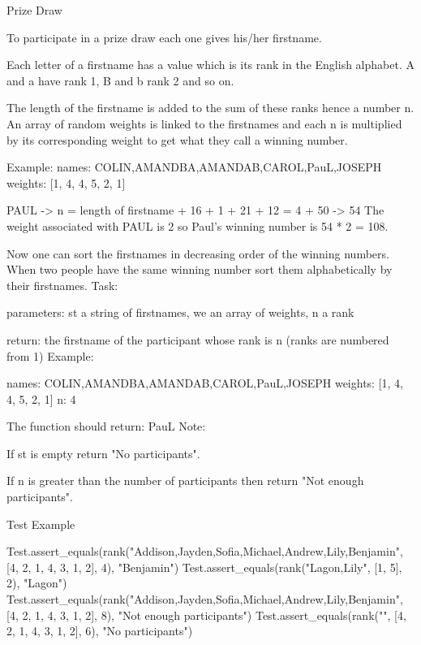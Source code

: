 Prize Draw

To participate in a prize draw each one gives his/her firstname.

Each letter of a firstname has a value which is its rank in the English alphabet. A and a have rank 1, B and b rank 2 and so on.

The length of the firstname is added to the sum of these ranks hence a number n. An array of random weights is linked to the firstnames and each n is multiplied by its corresponding weight to get what they call a winning number.

Example: names: COLIN,AMANDBA,AMANDAB,CAROL,PauL,JOSEPH weights: [1, 4, 4, 5, 2, 1]

PAUL -> n = length of firstname + 16 + 1 + 21 + 12 = 4 + 50 -> 54 The weight associated with PAUL is 2 so Paul's winning number is 54 * 2 = 108.

Now one can sort the firstnames in decreasing order of the winning numbers. When two people have the same winning number sort them alphabetically by their firstnames.
Task:

parameters: st a string of firstnames, we an array of weights, n a rank

return: the firstname of the participant whose rank is n (ranks are numbered from 1)
Example:

names: COLIN,AMANDBA,AMANDAB,CAROL,PauL,JOSEPH weights: [1, 4, 4, 5, 2, 1] n: 4

The function should return: PauL
Note:

If st is empty return "No participants".

If n is greater than the number of participants then return "Not enough participants".


Test Example

Test.assert_equals(rank("Addison,Jayden,Sofia,Michael,Andrew,Lily,Benjamin", [4, 2, 1, 4, 3, 1, 2], 4), "Benjamin")
Test.assert_equals(rank("Lagon,Lily", [1, 5], 2), "Lagon")
Test.assert_equals(rank("Addison,Jayden,Sofia,Michael,Andrew,Lily,Benjamin", [4, 2, 1, 4, 3, 1, 2], 8), "Not enough participants")
Test.assert_equals(rank("", [4, 2, 1, 4, 3, 1, 2], 6), "No participants")
